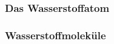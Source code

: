 \documentclass[../main.tex]{subfiles}
\begin{document}
        \subsubsection{Das Wasserstoffatom}


        \subsubsection*{Wasserstoffmoleküle}

    
\end{document}
